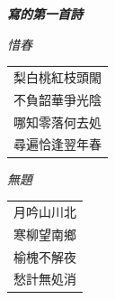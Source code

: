 \documentclass{ctexart}
\begin{document}
	\begin{titlepage}
		\thispagestyle{empty}
		
		\begingroup
		\setlength{\parindent}{0pt}
		\setlength{\parskip}{0pt}
		
		\noindent
		{\large \itshape \bfseries 寫的第一首詩}
		
		\vspace{2.0cm} 
		
		\begin{center}
			{\large \itshape 惜春}
			\vspace{0.3cm}
			
			\begin{minipage}{\linewidth}
				\centering
				{\large \itshape
					\begin{tabular}{@{}c@{}}
						梨白桃紅枝頭閙\\
						不負韶華爭光陰\\
						哪知零落何去処\\
						尋遍恰逢翌年春
					\end{tabular}
				}
			\end{minipage}
			
		\end{center}
		
		\endgroup
	\end{titlepage}
	
	\begin{titlepage}
		\thispagestyle{empty}
		
		\begingroup
		\setlength{\parindent}{0pt}
		\setlength{\parskip}{0pt}
		
		\vspace{3.0cm} 
		
		\begin{center}
			{\large \itshape 無題}
			\vspace{0.3cm}
			
			\begin{minipage}{\linewidth}
				\centering
				{\large \itshape
					\begin{tabular}{@{}c@{}}
						月吟山川北\\
						寒柳望南鄉\\
						榆槐不解夜\\
						愁計無処消
					\end{tabular}
				}
			\end{minipage}
			
		\end{center}
		
		\endgroup
	\end{titlepage}
	
\end{document}

